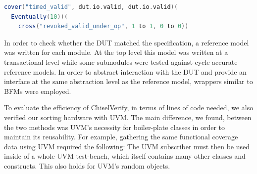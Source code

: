 \documentclass[conference]{IEEEtran}
\begin{document}
\begin{lstlisting}[language=scala, caption={A timed cover construct.}, label={lst:timedcover}]
cover("timed_valid", dut.io.valid, dut.io.valid)(
  Eventually(10))(
    cross("revoked_valid_under_op", 1 to 1, 0 to 0))
\end{lstlisting}

In order to check whether the DUT matched the specification, a reference model was written for each module. 
At the top level this model was written at a transactional level while some submodules were tested against cycle accurate reference models.
In order to abstract interaction with the DUT and provide an interface at the same abstraction level as the reference model, wrappers similar to BFMs were employed. 

To evaluate the efficiency of ChiselVerify, in terms of lines of code needed, we also verified our sorting hardware with UVM.
The main difference, we found, between the two methods was UVM's necessity for boiler-plate classes in order to maintain its reusability.
For example, gathering the same functional coverage data using UVM required the following: 
The UVM subscriber must then be used inside of a whole UVM test-bench, which itself contains many other classes and constructs.
This also holds for UVM's random objects.
\end{document}
